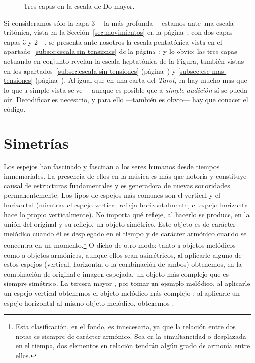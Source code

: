 \documentclass[a4paper,10pt]{article}
\begin{document}
  \begin{figure}[ht]
  \centering
  \caption{Tres capas en la escala de Do mayor.}\label{fig:capas-escala}
  \end{figure}

\begin{multicols}{2}

\noindent Si consideramos sólo la capa 3 ---la más profunda--- estamos ante una escala tritónica, vista en la Sección~\ref{sec:movimientos} en la página~\pageref{sec:movimientos}; con dos capas ---capas 3 y 2---, se presenta ante nosotros la escala pentatónica vista en el apartado~\ref{subsec:escala-sin-tensiones} de la página~\pageref{subsec:escala-sin-tensiones}; y lo obvio: las tres capas actuando en conjunto revelan la escala heptatónica de la Figura, también vistas en los apartados~\ref{subsec:escala-sin-tensiones} (página~\pageref{subsec:escala-sin-tensiones}) y \ref{subsec:esc-mas-tensiones} (página~\pageref{subsec:esc-mas-tensiones}). Al igual que en una carta del \emph{Tarot}, en  hay mucho más que lo que a simple vista se ve ---aunque es posible que a \emph{simple audición} sí se pueda oír. Decodificar es necesario, y para ello ---también es obvio--- hay que conocer el código.

\section{Simetrías}\label{sec:simetrias}
Los espejos han fascinado y fascinan a los seres humanos desde tiempos inmemoriales. La presencia de ellos en la música es más que notoria y constituye causal de estructuras fundamentales y es generadora de nuevas sonoridades permanentemente.  Los tipos de espejos más comunes son el vertical y el horizontal (mientras el espejo vertical refleja horizontalmente, el espejo horizontal hace lo propio verticalmente). No importa qué refleje, al hacerlo se produce, en la unión del original y su reflejo, un objeto simétrico. Este objeto es de carácter melódico cuando él es desplegado en el tiempo y de carácter armónico cuando se concentra en un momento.\footnote{Esta clasificación, en el fondo, es innecesaria, ya que la relación entre dos notas es siempre de carácter armónico. Sea en la simultaneidad o desplazada en el tiempo, dos elementos en relación tendrán algún grado de armonía entre ellos.} O dicho de otro modo: tanto a objetos melódicos como a objetos armónicos, aunque ellos sean asimétricos, al aplicarle alguno de estos espejos (vertical, horizontal o la combinación de ambos) obtenemos, en la combinación de original e imagen espejada, un objeto más complejo que es siempre simétrico. La tercera mayor \hbox{,} por tomar un ejemplo melódico, al aplicarle un espejo vertical obtenemos el objeto melódico más complejo \hbox{;} al aplicarle un espejo horizontal al mismo objeto melódico, obtenemos \hbox{.}


\end{multicols}
\end{document}

